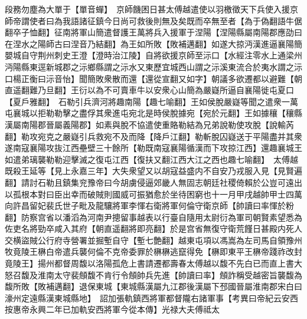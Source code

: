 段務勿塵為大單于【單音蟬】　京師饑困日甚太傅越遣使以羽檄徵天下兵使入援京師帝謂使者曰為我語諸征鎮今日尚可救後則無及矣既而卒無至者【為于偽翻語牛倨翻卒子恤翻】征南將軍山簡遣督護王萬將兵入援軍于涅陽【涅陽縣屬南陽郡應劭曰在涅水之陽師古曰涅音乃結翻】為王如所敗【敗補邁翻】如遂大掠沔漢進逼襄陽簡嬰城自守荆州刺史王澄【澄時治江陵】自將欲援京師至沶口【水經注零水上通梁州沔陽縣東逕新城郡之沶鄉縣謂之沶水又東歷宜城西山謂之沶溪東流合於夷水謂之沶口楊正衡曰沶音怡】聞簡敗衆散而還【還從宣翻又如字】朝議多欲遷都以避難【朝直遥翻難乃旦翻】王衍以為不可賣車牛以安衆心山簡為嚴嶷所逼自襄陽徙屯夏口【夏戶雅翻】　石勒引兵濟河將趣南陽【趣七喻翻】王如侯脫嚴嶷等聞之遣衆一萬屯襄城以拒勒勒擊之盡俘其衆進屯宛北是時侯脫據宛【宛於元翻】王如據穰【穰縣漢屬南陽郡晉屬義陽郡】如素與脫不協遣使重賂勒結為兄弟說勒使攻脫【說輸芮翻】勒攻宛克之嚴嶷引兵救宛不及而降【降戶江翻】勒斬脫囚嶷送于平陽盡并其衆遂南寇襄陽攻抜江西壘壁三十餘所【勒既南寇襄陽循漢而下攻掠江西】還趣襄城王如遣弟璃襲勒勒迎擊滅之復屯江西【復扶又翻江西大江之西也趣七喻翻】　太傅越既殺王延等【見上永嘉三年】大失衆望又以胡寇益盛内不自安乃戎服入見【見賢遍翻】請討石勒且鎮集兖豫帝曰今胡虜侵逼郊畿人無固志朝廷社稷倚賴於公豈可遠出以孤根本對曰臣出幸而破賊則國威可振猶愈於坐待困窮也十一月甲戌越帥甲士四萬向許昌留妃裴氏世子毗及龍驤將軍李惲右衛將軍何倫守衛京師【帥讀曰率惲於粉翻】防察宫省以潘滔為河南尹摠留事越表以行臺自隨用太尉衍為軍司朝賢素望悉為佐吏名將勁卒咸入其府【朝直遥翻將即亮翻】於是宫省無復守衛荒饉日甚殿内死人交横盜賊公行府寺營署並掘塹自守【塹七艶翻】越東屯項以馮嵩為左司馬自領豫州牧竟陵王楙白帝遣兵襲何倫不克帝委罪於楙楙逃竄得免【楙即東平王楙帝踐祚改封竟陵王】揚州都督周馥以洛陽孤危上書請遷都壽春太傅越以馥不先白已而直上書大怒召馥及淮南太守裴頠馥不肯行令頠帥兵先進【帥讀曰率】頠詐稱受越密旨襲馥為馥所敗【敗補邁翻】退保東城【東城縣漢屬九江郡後漢屬下邳國晉屬淮南郡宋白曰濠州定遠縣漢東城縣地】　詔加張軌鎮西將軍都督隴右諸軍事【考異曰帝紀云安西按惠帝永興二年已加軌安西將軍今從本傳】光禄大夫傅祗太

